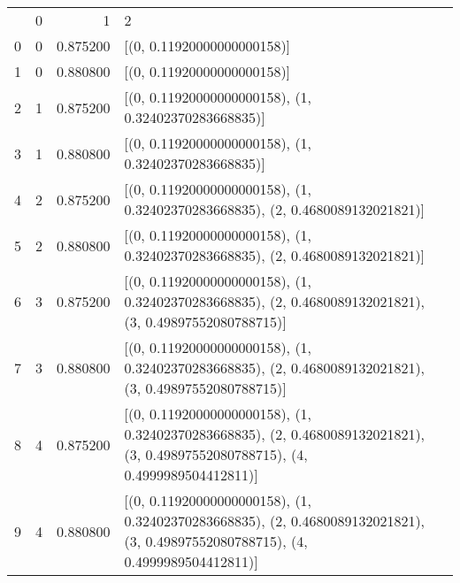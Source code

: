 \begin{tabular}{lrrl}
 & 0 & 1 & 2 \\
0 & 0 & 0.875200 & [(0, 0.11920000000000158)] \\
1 & 0 & 0.880800 & [(0, 0.11920000000000158)] \\
2 & 1 & 0.875200 & [(0, 0.11920000000000158), (1, 0.32402370283668835)] \\
3 & 1 & 0.880800 & [(0, 0.11920000000000158), (1, 0.32402370283668835)] \\
4 & 2 & 0.875200 & [(0, 0.11920000000000158), (1, 0.32402370283668835), (2, 0.4680089132021821)] \\
5 & 2 & 0.880800 & [(0, 0.11920000000000158), (1, 0.32402370283668835), (2, 0.4680089132021821)] \\
6 & 3 & 0.875200 & [(0, 0.11920000000000158), (1, 0.32402370283668835), (2, 0.4680089132021821), (3, 0.49897552080788715)] \\
7 & 3 & 0.880800 & [(0, 0.11920000000000158), (1, 0.32402370283668835), (2, 0.4680089132021821), (3, 0.49897552080788715)] \\
8 & 4 & 0.875200 & [(0, 0.11920000000000158), (1, 0.32402370283668835), (2, 0.4680089132021821), (3, 0.49897552080788715), (4, 0.4999989504412811)] \\
9 & 4 & 0.880800 & [(0, 0.11920000000000158), (1, 0.32402370283668835), (2, 0.4680089132021821), (3, 0.49897552080788715), (4, 0.4999989504412811)] \\
\end{tabular}

